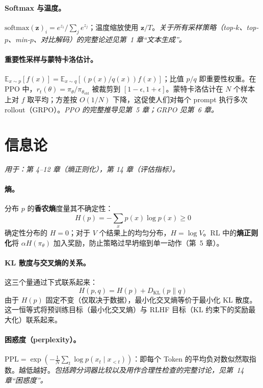 \paragraph{Softmax 与温度。}
$\mathrm{softmax}(\mathbf{z})_i = e^{z_i}/\sum_j e^{z_j}$；温度缩放使用 $\mathbf{z}/T$。\emph{关于所有采样策略（top-$k$、top-$p$、min-$p$、对比解码）的完整论述见第~1 章“文本生成”。}

\paragraph{重要性采样与蒙特卡洛估计。}
$\mathbb{E}_{x\sim p}[f(x)] = \mathbb{E}_{x\sim q}[(p(x)/q(x))f(x)]$；比值 $p/q$ 即重要性权重。在 PPO 中，$r_t(\theta) = \pi_\theta/\pi_{\theta_{\mathrm{old}}}$ 被裁剪到 $[1-\epsilon,1+\epsilon]$。蒙特卡洛估计在 $N$ 个样本上对 $f$ 取平均；方差按 $O(1/N)$ 下降，这促使人们对每个 prompt 执行多次 rollout（GRPO）。\emph{PPO 的完整推导见第~5 章；GRPO 见第~6 章。}

\section{信息论}
\label{app:information-theory}

\emph{用于：第 4--12 章（熵正则化），第 14 章（评估指标）。}

\paragraph{熵。}
分布 $p$ 的\textbf{香农熵}度量其不确定性：
\begin{equation}
H(p) = -\sum_x p(x) \log p(x) \geq 0
\end{equation}
确定性分布的 $H = 0$；对于 $V$ 个结果上的均匀分布，$H = \log V$。RL 中的\textbf{熵正则化}将 $\alpha H(\pi_\theta)$ 加入奖励，防止策略过早坍缩到单一动作（第~5 章）。

\paragraph{KL 散度与交叉熵的关系。}
这三个量通过下式联系起来：
\[
H(p, q) = H(p) + D_{\mathrm{KL}}(p \| q)
\]
由于 $H(p)$ 固定不变（仅取决于数据），最小化交叉熵等价于最小化 KL 散度。这一恒等式将预训练目标（最小化交叉熵）与 RLHF 目标（KL 约束下的奖励最大化）联系起来。

\paragraph{困惑度（perplexity）。}
$\mathrm{PPL} = \exp\!\left(-\frac{1}{N}\sum_t \log p(x_t \mid x_{<t})\right)$：即每个 Token 的平均负对数似然取指数。越低越好。\emph{包括跨分词器比较以及用作合理性检查的完整讨论，见第~14 章“困惑度”。}

